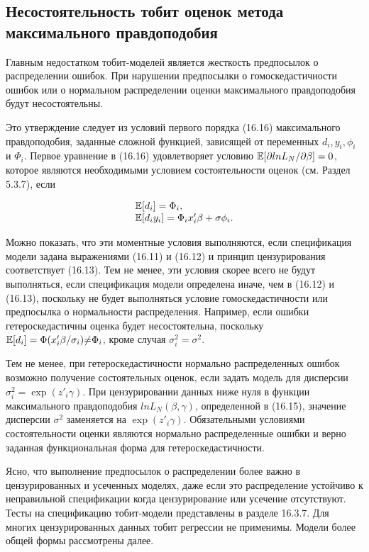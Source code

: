 \subsection{Несостоятельность тобит оценок метода максимального правдоподобия}

Главным недостатком тобит-моделей является жесткость предпосылок о распределении ошибок. При нарушении предпосылки о гомоскедастичности ошибок или о нормальном распределении оценки максимального правдоподобия будут несостоятельны.

Это утверждение следует из условий первого порядка (16.16) максимального правдоподобия, заданные сложной функцией, зависящей от переменных $d_i, y_i, \phi_i$ и $\Phi_i$. Первое уравнение в (16.16) удовлетворяет условию $\mathbb{E}[\partial{lnL_N}/\partial\beta]=0$, которое являются необходимыми условием состоятельности оценок (см. Раздел 5.3.7), если

\[
\begin{array}{l}
\mathbb{E}[d_i]=\Phi_i, \\
\mathbb{E}[d_{i}y_{i}]=\Phi_{i}x'_{i}\beta+\sigma\phi_i.
\end{array}
\]

Можно показать, что эти моментные условия выполняются, если спецификация модели задана выражениями (16.11) и (16.12) и принцип цензурирования соответствует (16.13). Тем не менее, эти условия скорее всего не будут выполняться, если спецификация модели определена иначе, чем в (16.12) и (16.13), поскольку не будет выполняться условие гомоскедастичности или предпосылка о нормальности распределения. Например, если ошибки гетероскедастичны оценка будет несостоятельна, поскольку $\mathbb{E}[d_i]=\Phi(x'_{i}\beta/\sigma_{i}){\neq}\Phi_{i}$, кроме случая $\sigma^2_i=\sigma^{2}$.

Тем не менее, при гетероскедастичности нормально распределенных ошибок возможно получение состоятельных оценок, если задать модель для дисперсии $\sigma^2_i=\exp (z'_i\gamma)$. При цензурировании данных ниже нуля в функции максимального правдоподобия $lnL_{N}(\beta,\gamma)$, определенной в (16.15), значение дисперсии $\sigma^2$ заменяется на $\exp (z'_i\gamma)$. Обязательными условиями состоятельности оценки являются нормально распределенные ошибки и верно заданная функциональная форма для гетероскедастичности.


Ясно, что выполнение предпосылок о распределении более важно в цензурированных и усеченных моделях, даже если это распределение устойчиво к неправильной спецификации когда цензурирование или усечение отсутствуют. Тесты на спецификацию тобит-модели представлены в разделе 16.3.7. Для многих цензурированных данных тобит регрессии не применимы. Модели более общей формы рассмотрены далее.


